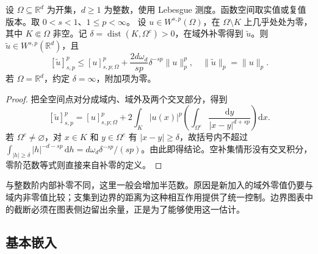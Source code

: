 \begin{lemma}\label{b1:lem:compact-fractional-zero-extension}
设 \(\Omega\subseteq\mathbb R^d\) 为开集，\(d\geq1\) 为整数，使用 Lebesgue 测度。函数空间取实值或复值版本。取 \(0<s<1\)、\(1\leq p<\infty\)。
设 \(u\in W^{s,p}(\Omega)\)，在 \(\Omega\setminus K\) 上几乎处处为零，其中 \(K\Subset\Omega\) 非空。记 \(\delta=\operatorname{dist}(K,\Omega^c)>0\)，在域外补零得到 \(\widetilde u\)。则 \(\widetilde u\in W^{s,p}(\mathbb R^d)\)，且
\begin{equation}\label{b1:eq:compact-fractional-zero-extension}
 [\widetilde u]_{s,p}^p
 \leq[u]_{s,p;\Omega}^p
       +\frac{2d\omega_d}{sp}\delta^{-sp}\|u\|_p^p,
 \quad\|\widetilde u\|_p=\|u\|_p.
\end{equation}
若 \(\Omega=\mathbb R^d\)，约定 \(\delta=\infty\)，附加项为零。
\end{lemma}
\begin{proof}
把全空间点对分成域内、域外及两个交叉部分，得到
\[
 [\widetilde u]_{s,p}^p
 =[u]_{s,p;\Omega}^p
   +2\int_K |u(x)|^p
      \left(\int_{\Omega^c}\frac{\mathrm dy}{|x-y|^{d+sp}}\right)\mathrm dx.
\]
若 \(\Omega^c\ne\varnothing\)，对 \(x\in K\) 和 \(y\in\Omega^c\) 有 \(|x-y|\geq\delta\)，故括号内不超过
\(\int_{|h|\geq\delta}|h|^{-d-sp}\,\mathrm dh
=d\omega_d\delta^{-sp}/(sp)\)。由此即得结论。空补集情形没有交叉积分，零阶范数等式则直接来自补零的定义。
\end{proof}

与整数阶内部补零不同，这里一般会增加半范数。原因是新加入的域外零值仍要与域内非零值比较；支集到边界的距离为这种相互作用提供了统一控制。边界图表中的截断必须在图表侧边留出余量，正是为了能够使用这一估计。

\subsection{基本嵌入}
\label{b1:subsec:230203}

